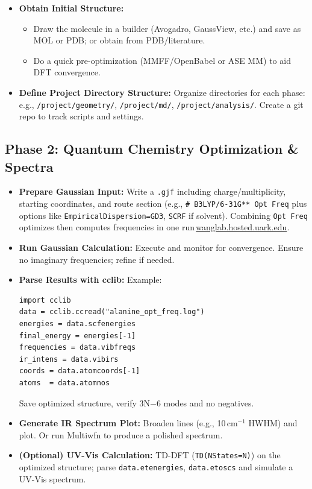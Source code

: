 \documentclass[11pt]{article}
\begin{document}
\begin{itemize}
\begin{itemize}
  \end{itemize}
  \item \textbf{Obtain Initial Structure:}
  \begin{itemize}
    \item Draw the molecule in a builder (Avogadro, GaussView, etc.) and save as MOL or PDB; or obtain from PDB/literature.
    \item Do a quick pre-optimization (MMFF/OpenBabel or ASE MM) to aid DFT convergence.
  \end{itemize}
  \item \textbf{Define Project Directory Structure:} Organize directories for each phase: e.g., \texttt{/project/geometry/}, \texttt{/project/md/}, \texttt{/project/analysis/}. Create a git repo to track scripts and settings.
\end{itemize}

\subsection*{Phase 2: Quantum Chemistry Optimization \& Spectra}
\begin{itemize}
  \item \textbf{Prepare Gaussian Input:} Write a \texttt{.gjf} including charge/multiplicity, starting coordinates, and route section (e.g., \texttt{\# B3LYP/6-31G** Opt Freq} plus options like \texttt{EmpiricalDispersion=GD3}, \texttt{SCRF} if solvent). Combining \texttt{Opt Freq} optimizes then computes frequencies in one run\,\href{https://wanglab.hosted.uark.edu/g98help/00000437.htm\#:\~:text=frequencies\%20for\%20a\%20correlated\%20method,route\%20section\%20for\%20a\%20job}{wanglab.hosted.uark.edu}.
  \item \textbf{Run Gaussian Calculation:} Execute and monitor for convergence. Ensure no imaginary frequencies; refine if needed.
  \item \textbf{Parse Results with cclib:} Example:
\begin{verbatim}
import cclib
data = cclib.ccread("alanine_opt_freq.log")
energies = data.scfenergies
final_energy = energies[-1]
frequencies = data.vibfreqs
ir_intens = data.vibirs
coords = data.atomcoords[-1]
atoms  = data.atomnos
\end{verbatim}
  Save optimized structure, verify 3N$-$6 modes and no negatives.
  \item \textbf{Generate IR Spectrum Plot:} Broaden lines (e.g., 10\,cm$^{-1}$ HWHM) and plot. Or run Multiwfn to produce a polished spectrum.
  \item \textbf{(Optional) UV-Vis Calculation:} TD-DFT (\texttt{TD(NStates=N)}) on the optimized structure; parse \texttt{data.etenergies}, \texttt{data.etoscs} and simulate a UV-Vis spectrum.
\end{itemize}
\end{document}
